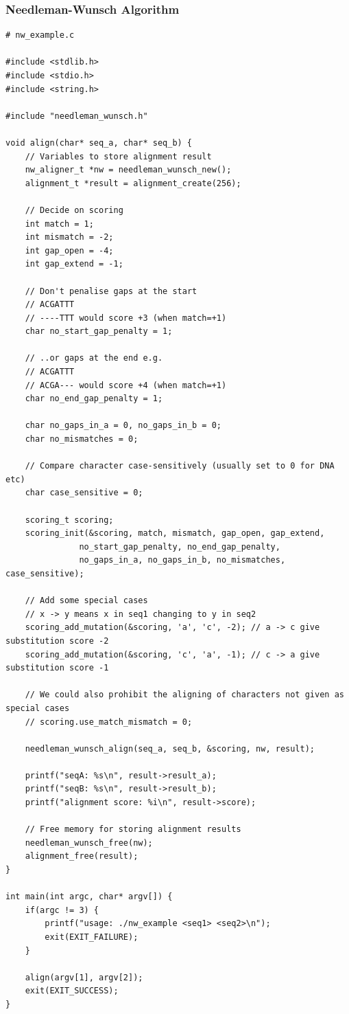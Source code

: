 \documentclass{article}
\begin{document}
\subsubsection*{Needleman-Wunsch Algorithm}
\begin{lstlisting}
# nw_example.c

#include <stdlib.h>
#include <stdio.h>
#include <string.h>

#include "needleman_wunsch.h"

void align(char* seq_a, char* seq_b) {
  	// Variables to store alignment result
  	nw_aligner_t *nw = needleman_wunsch_new();
  	alignment_t *result = alignment_create(256);
		
  	// Decide on scoring
  	int match = 1;
  	int mismatch = -2;
  	int gap_open = -4;
  	int gap_extend = -1;
 		 
  	// Don't penalise gaps at the start
  	// ACGATTT
  	// ----TTT would score +3 (when match=+1)
  	char no_start_gap_penalty = 1;
 		 
  	// ..or gaps at the end e.g.
  	// ACGATTT
  	// ACGA--- would score +4 (when match=+1)
  	char no_end_gap_penalty = 1;
		
  	char no_gaps_in_a = 0, no_gaps_in_b = 0;
  	char no_mismatches = 0;
		
  	// Compare character case-sensitively (usually set to 0 for DNA etc)
  	char case_sensitive = 0;
		
  	scoring_t scoring;
  	scoring_init(&scoring, match, mismatch, gap_open, gap_extend,
               no_start_gap_penalty, no_end_gap_penalty,
               no_gaps_in_a, no_gaps_in_b, no_mismatches, case_sensitive);
	
  	// Add some special cases
  	// x -> y means x in seq1 changing to y in seq2
  	scoring_add_mutation(&scoring, 'a', 'c', -2); // a -> c give substitution score -2
  	scoring_add_mutation(&scoring, 'c', 'a', -1); // c -> a give substitution score -1
		
  	// We could also prohibit the aligning of characters not given as special cases
  	// scoring.use_match_mismatch = 0;
		
  	needleman_wunsch_align(seq_a, seq_b, &scoring, nw, result);
		
  	printf("seqA: %s\n", result->result_a);
  	printf("seqB: %s\n", result->result_b);
  	printf("alignment score: %i\n", result->score);
		
	// Free memory for storing alignment results
	needleman_wunsch_free(nw);
	alignment_free(result);
}

int main(int argc, char* argv[]) {
	if(argc != 3) {
		printf("usage: ./nw_example <seq1> <seq2>\n");
		exit(EXIT_FAILURE);
  	}

  	align(argv[1], argv[2]);
  	exit(EXIT_SUCCESS);
}
\end{lstlisting}
\end{document}
